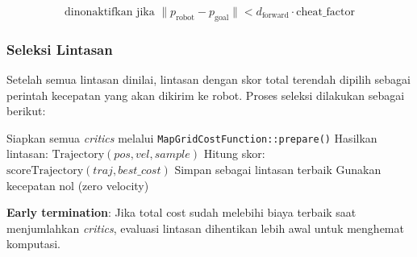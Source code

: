 \begin{equation}
\text{dinonaktifkan jika } \|p_{\text{robot}} - p_{\text{goal}}\|
< d_{\text{forward}} \cdot \text{cheat\_factor}
\end{equation}

\subsubsection{Seleksi Lintasan}

Setelah semua lintasan dinilai, lintasan dengan skor total terendah
dipilih sebagai perintah kecepatan yang akan dikirim ke robot.
Proses seleksi dilakukan sebagai berikut:

\begin{algorithm}[H]
\caption{Seleksi lintasan terbaik}
\label{alg:trajectory_selection}
\begin{algorithmic}[1]
\State Siapkan semua \emph{critics} melalui \texttt{MapGridCostFunction::prepare()}
    \State Hasilkan lintasan: $\text{Trajectory}(pos, vel, sample)$
    \State Hitung skor: $\text{scoreTrajectory}(traj, best\_cost)$
        \State Simpan sebagai lintasan terbaik
    \EndIf
\EndFor
{}
    \State Gunakan kecepatan nol (zero velocity)
\EndIf
\end{algorithmic}
\end{algorithm}

\textbf{Early termination}: Jika total cost sudah melebihi
biaya terbaik saat menjumlahkan \emph{critics}, evaluasi
lintasan dihentikan lebih awal untuk menghemat komputasi.

